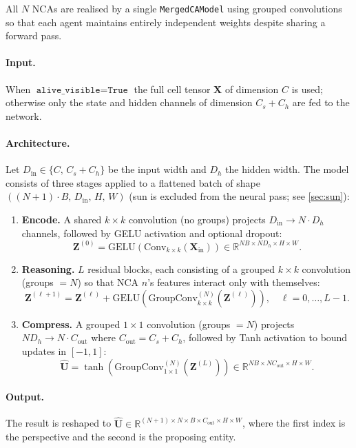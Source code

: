 \documentclass[11pt,a4paper]{article}
\newcommand{\R}{\mathbb{R}}
\theoremstyle{definition}
\begin{document}
All $N$ NCAs are realised by a single \texttt{MergedCAModel} using grouped convolutions so that each agent maintains entirely independent weights despite sharing a forward pass.

\paragraph{Input.} When $\texttt{alive\_visible} = \texttt{True}$ the full cell tensor $\mathbf{X}$ of dimension $C$ is used; otherwise only the state and hidden channels of dimension $C_s + C_h$ are fed to the network.

\paragraph{Architecture.} Let $D_\mathrm{in} \in \{C,\, C_s+C_h\}$ be the input width and $D_h$ the hidden width. The model consists of three stages applied to a flattened batch of shape $((N+1) \cdot B,\, D_\mathrm{in},\, H,\, W)$ (sun is excluded from the neural pass; see \cref{sec:sun}):

\begin{enumerate}
    \item \textbf{Encode.} A shared $k\times k$ convolution (no groups) projects $D_\mathrm{in} \to N \cdot D_h$ channels, followed by GELU activation and optional dropout:
    \[
        \mathbf{Z}^{(0)} = \mathrm{GELU}\!\left(\mathrm{Conv}_{k\times k}(\mathbf{X}_{\mathrm{in}})\right) \in \R^{NB \times N D_h \times H \times W}.
    \]
    \item \textbf{Reasoning.} $L$ residual blocks, each consisting of a grouped $k\times k$ convolution (groups $= N$) so that NCA $n$'s features interact only with themselves:
    \[
        \mathbf{Z}^{(\ell+1)} = \mathbf{Z}^{(\ell)} + \mathrm{GELU}\!\left(\mathrm{GroupConv}_{k\times k}^{(N)}(\mathbf{Z}^{(\ell)})\right), \quad \ell = 0,\ldots,L-1.
    \]
    \item \textbf{Compress.} A grouped $1\times 1$ convolution (groups $= N$) projects $ND_h \to N \cdot C_\mathrm{out}$ where $C_\mathrm{out} = C_s + C_h$, followed by Tanh activation to bound updates in $[-1,1]$:
    \[
        \hat{\mathbf{U}} = \tanh\!\left(\mathrm{GroupConv}_{1\times 1}^{(N)}(\mathbf{Z}^{(L)})\right) \in \R^{NB \times N C_\mathrm{out} \times H \times W}.
    \]
\end{enumerate}

\paragraph{Output.} The result is reshaped to $\hat{\mathbf{U}} \in \R^{(N+1) \times N \times B \times C_\mathrm{out} \times H \times W}$, where the first index is the perspective and the second is the proposing entity.
\end{document}
